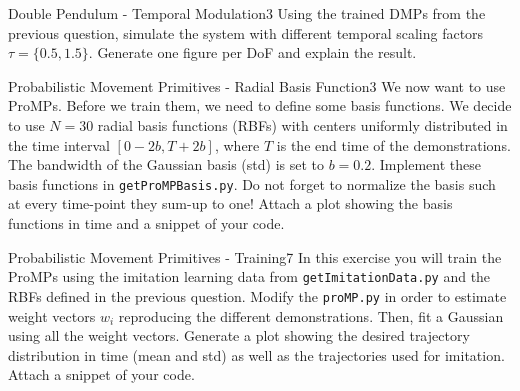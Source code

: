 \begin{questions}

\begin{question}{Double Pendulum - Temporal Modulation}{3}
Using the trained DMPs from the previous question, simulate the system with different temporal scaling factors $\tau=\{0.5, 1.5\}$. Generate one figure per DoF and explain the result.

\begin{answer}\end{answer}


\end{question}


\begin{question}[bonus]{Probabilistic Movement Primitives - Radial Basis Function}{3}
We now want to use ProMPs. Before we train them, we need to define some basis functions. We decide to use $N = 30$ radial basis functions (RBFs) with centers uniformly distributed in the time interval $[0-2b,T+2b]$, where $T$ is the end time of the demonstrations.
The bandwidth of the Gaussian basis (std) is set to $b=0.2$. 
Implement these basis functions in \texttt{getProMPBasis.py}. 
Do not forget to normalize the basis such at every time-point they sum-up to one! Attach a plot showing the basis functions in time and a snippet of your code. 

\begin{answer}\end{answer}
\end{question}


\begin{question}[bonus]{Probabilistic Movement Primitives - Training}{7}
In this exercise you will train the ProMPs using the imitation learning data from \texttt{getImitationData.py} and the RBFs defined in the previous question. Modify the \texttt{proMP.py} in order to estimate weight vectors $w_i$ reproducing the different demonstrations. Then, fit a Gaussian using all the weight vectors. Generate a plot showing the desired trajectory distribution in time (mean and std) as well as the trajectories used for imitation. Attach a snippet of your code.

\begin{answer}\end{answer}

\end{question}


\end{questions}
